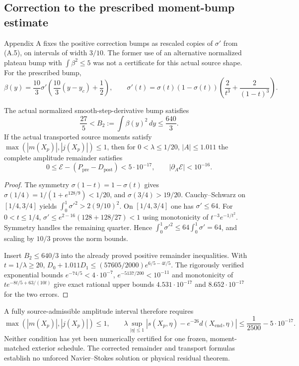 \subsection*{Correction to the prescribed moment-bump estimate}
Appendix A fixes the positive correction bumps as rescaled copies
of $\sigma'$ from (A.5), on intervals of width $3/10$.
The former use of an alternative normalized plateau bump with
$\int\beta^2\le5$ was not a certificate for this actual
source shape. For the prescribed bump,
\[
\beta(y)=\frac{10}{3}\sigma'\left(
 \frac{10}{3}(y-y_c)+\frac12\right),\qquad
\sigma'(t)=\sigma(t)(1-\sigma(t))
\left(\frac2{t^3}+\frac2{(1-t)^3}\right).
\]
\begin{proposition}
\label{prop:true-source-bump-L2}
The actual normalized smooth-step-derivative bump satisfies
\begin{equation}\label{eq:source-bump-correct}
\frac{27}{5}<B_2:=\int\beta(y)^2\,dy\le\frac{640}{3}.
\end{equation}
If the actual transported source moments satisfy
$\max(|m(X_p)|,|j(X_p)|)\le1$, then for
$0<\lambda\le1/20$, $|A|\le1.011$ the
complete amplitude remainder satisfies
\[
0\le\mathcal E-(P_{\mathrm{pre}}-D_{\mathrm{post}})
<5\cdot10^{-17},\qquad
|\partial_A\mathcal E|<10^{-16}.
\]
\end{proposition}
\begin{proof}
The symmetry $\sigma(1-t)=1-\sigma(t)$ gives
$\sigma(1/4)=1/(1+e^{128/9})<1/20$,
and $\sigma(3/4)>19/20$.
Cauchy--Schwarz on $[1/4,3/4]$ yields
$\int_0^1\sigma'^2>2(9/10)^2$.
On $[1/4,3/4]$ one has $\sigma'\le64$.
For $0<t\le1/4$,
$\sigma'\le e^{2-16}(128+128/27)<1$ using
monotonicity of $t^{-3}e^{-1/t^2}$.
Symmetry handles the remaining quarter. Hence
$\int_0^1\sigma'^2\le64\int_0^1\sigma'=64$,
and scaling by $10/3$ proves the norm bounds.

Insert $B_2\le640/3$ into the already proved
positive remainder inequalities. With $t=1/\lambda\ge20$,
$D_0+1.011D_1\le(57605/2000)e^{6/5-4t/5}$.
The rigorously verified exponential bounds
$e^{-74/5}<4\cdot10^{-7}$,
$e^{-5137/200}<10^{-11}$ and monotonicity of
$t e^{-8t/5+63/(10t)}$ give exact rational upper
bounds $4.531\cdot10^{-17}$ and
$8.652\cdot10^{-17}$ for the two errors.
\end{proof}
A fully source-admissible amplitude interval therefore requires
\[
\max(|m(X_p)|,|j(X_p)|)\le1,\qquad
\lambda\sup_{|\eta|\le1}
|s(X_p,\eta)-e^{-26}d(X_{\mathrm{end}},\eta)|
\le\frac1{2500}-5\cdot10^{-17}.
\]
Neither condition has yet been numerically certified for one
frozen, moment-matched exterior schedule. The corrected
remainder and transport formulas establish no unforced
Navier--Stokes solution or physical residual theorem.
